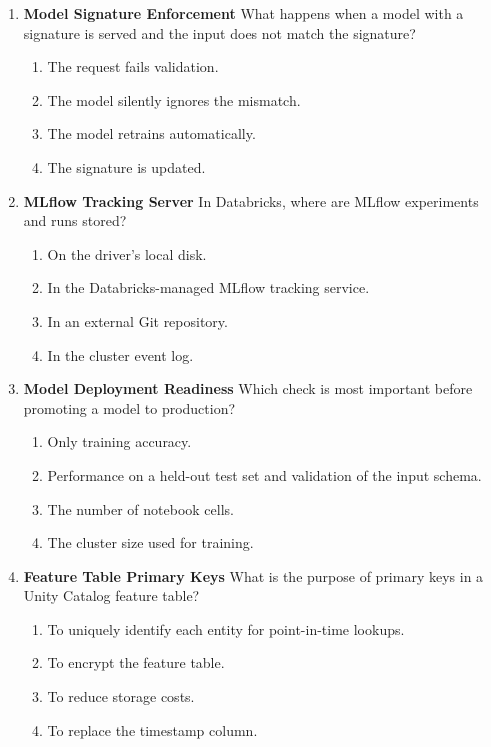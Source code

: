 \documentclass{article}
\begin{document}
\begin{enumerate}[label=\textbf{Q\arabic*.}]
		\item \textbf{Model Signature Enforcement}
		What happens when a model with a signature is served and the input does not match the signature?
		\begin{enumerate}[label=\Alph*.]
			\item The request fails validation.
			\item The model silently ignores the mismatch.
			\item The model retrains automatically.
			\item The signature is updated.
		\end{enumerate}
		
		\item \textbf{MLflow Tracking Server}
		In Databricks, where are MLflow experiments and runs stored?
		\begin{enumerate}[label=\Alph*.]
			\item On the driver's local disk.
			\item In the Databricks-managed MLflow tracking service.
			\item In an external Git repository.
			\item In the cluster event log.
		\end{enumerate}
		
		\item \textbf{Model Deployment Readiness}
		Which check is most important before promoting a model to production?
		\begin{enumerate}[label=\Alph*.]
			\item Only training accuracy.
			\item Performance on a held-out test set and validation of the input schema.
			\item The number of notebook cells.
			\item The cluster size used for training.
		\end{enumerate}
		
		\item \textbf{Feature Table Primary Keys}
		What is the purpose of primary keys in a Unity Catalog feature table?
		\begin{enumerate}[label=\Alph*.]
			\item To uniquely identify each entity for point-in-time lookups.
			\item To encrypt the feature table.
			\item To reduce storage costs.
			\item To replace the timestamp column.
		\end{enumerate}
		

\end{enumerate}
\end{document}
